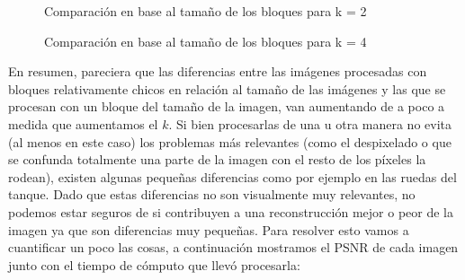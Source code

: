 \documentclass[a4paper]{article}
\begin{document}
\begin{figure}[H]
\centering
{}
\caption{Comparación en base al tamaño de los bloques para k = 2}
\end{figure}

\begin{figure}[H]
\centering
{}
\caption{Comparación en base al tamaño de los bloques para k = 4}
\end{figure}

\par En resumen, pareciera que las diferencias entre las imágenes procesadas con bloques relativamente chicos en relación al tamaño de las imágenes y las que se procesan con un bloque del tamaño de la imagen, van aumentando de a poco a medida que aumentamos el $k$. Si bien procesarlas de una u otra manera no evita (al menos en este caso) los problemas más relevantes (como el despixelado o que se confunda totalmente una parte de la imagen con el resto de los píxeles la rodean), existen algunas pequeñas diferencias como por ejemplo en las ruedas del tanque. Dado que estas diferencias no son visualmente muy relevantes, no podemos estar seguros de si contribuyen a una reconstrucción mejor o peor de la imagen ya que son diferencias muy pequeñas. Para resolver esto vamos a cuantificar un poco las cosas, a continuación mostramos el PSNR de cada imagen junto con el tiempo de cómputo que llevó procesarla:
\newline
\end{document}
